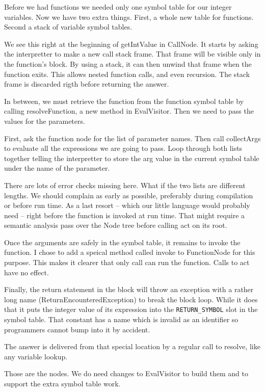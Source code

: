 Before we had functions we needed only one symbol table for our integer
variables. Now we have two extra things. First, a whole new
table for functions. Second a stack of variable symbol tables.

We see this right at the beginning of getIntValue in CallNode. It
starts by asking the interpretter to make a new call stack frame.
That frame will be visible only in the function's block. By using
a stack, it can then unwind that frame when the function exits.
This allows nested function calls, and even recursion.
The stack frame is discarded rigth before returning the answer.

In between, we must retrieve the function from the function
symbol table by calling resolveFunction, a new method in EvalVisitor.
Then we need to pass the values for the parameters.

First, ask the function node for the list of parameter names.
Then call collectArgs to evaluate all the expressions we are
going to pass. Loop through both lists together telling the
interpretter to store the arg value in the current symbol table 
under the name of the parameter.

There are lots of error checks missing here. What if the two
lists are different lengths. We should complain as early as
possible, preferably during compilation or before run time.
As a last resort -- which our little language would probably
need -- right before the function is invoked at run time.
That might require a semantic analysis pass over the Node tree
before calling act on its root.

Once the arguments are safely in the symbol table, it remains
to invoke the function. I chose to add a speical method called
invoke to FunctionNode for this purpose. This makes it clearer
that only call can run the function. Calls to act have no effect.

Finally, the return statement in the block will throw an exception
with a rather long name (ReturnEncounteredException) to break
the block loop. While it does that it puts the integer value of
its expression into the \verb+RETURN_SYMBOL+ slot in the symbol table.
That constant has a name which is invalid as an identifier
so programmers cannot bump into it by accident.

The answer is delivered from that special location by a regular
call to resolve, like any variable lookup.

Those are the nodes. We do need changes to EvalVisitor to build
them and to support the extra symbol table work.


